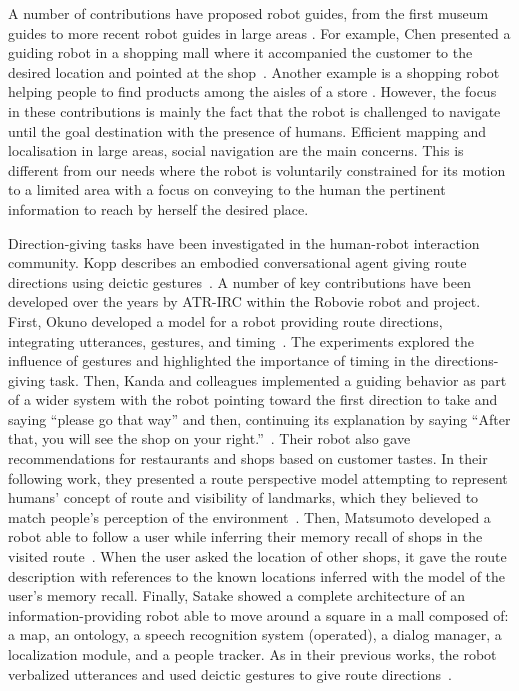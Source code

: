 \documentclass[a4paper,11pt,twoside]{StyleThese}
\begin{document}
A number of contributions have proposed robot guides, from the first museum guides \cite{burgard_1999_museum, thrun_99, siegwart_2003_robox, clodic_2006_rackham} to more recent robot guides in large areas \cite{bauer_2009_autonomous, triebel_2016_spencer}. For example, Chen \etal{} presented a guiding robot in a shopping mall where it accompanied the customer to the desired location and pointed at the shop~\cite{chen_2017_robots}. Another example is a shopping robot helping people to find products among the aisles of a store \cite{gross_2009_toomas}. 
However, the focus in these contributions is mainly the fact that the robot is challenged to navigate until the goal destination with the presence of humans. Efficient mapping and localisation in large areas, social navigation are the main concerns. This is different from our needs where the robot is voluntarily constrained for its motion to a limited area with a focus on conveying to the human the pertinent information to reach by herself the desired place.

Direction-giving tasks have been investigated in the human-robot interaction community. Kopp \etal{} describes an embodied conversational agent giving route directions using deictic gestures~\cite{kopp_2007}. A number of key contributions have been developed over the years by ATR-IRC within the Robovie robot and project. First, Okuno \etal{} developed a model for a robot providing route directions, integrating utterances, gestures, and timing~\cite{okuno_2009_providing}. The experiments explored the influence of gestures and highlighted the importance of timing in the directions-giving task. Then, Kanda and colleagues implemented a guiding behavior as part of a wider system with the robot pointing toward the first direction to take and saying ``please go that way'' and then, continuing its explanation by saying ``After that, you will see the shop on your right.''~\cite{kanda_2009_affective, kanda_2010_communication}. Their robot also gave recommendations for restaurants and shops based on customer tastes. In their following work, they presented a route perspective model attempting to represent humans' concept of route and visibility of landmarks, which they believed to match people's perception of the environment~\cite{morales_2011}. Then, Matsumoto \etal{} developed a robot able to follow a user while inferring their memory recall of shops in the visited route~\cite{matsumoto_2012_you}. When the user asked the location of other shops, it gave the route description with references to the known locations inferred with the model of the user's memory recall. Finally, Satake \etal{} showed a complete architecture of an information-providing robot able to move around a square in a mall composed of: a map, an ontology, a speech recognition system (operated), a dialog manager, a localization module, and a people tracker. As in their previous works, the robot verbalized utterances and used deictic gestures to give route directions~\cite{satake_2015_should}. 
\end{document}
